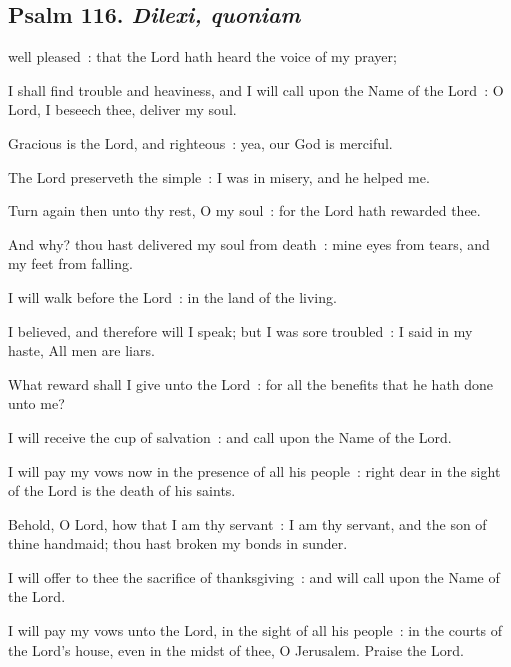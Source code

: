 \subsection{Psalm 116. \textit{Dilexi, quoniam}}


 well pleased~: that the Lord hath heard the voice of my prayer;\par
{}
I shall find trouble and heaviness, and I will call upon the Name of the Lord~: O Lord, I beseech thee, deliver my soul.\par
{}Gracious is the Lord, and righteous~: yea, our God is merciful.\par
{}The Lord preserveth the simple~: I was in misery, and he helped me.\par
{}Turn again then unto thy rest, O my soul~: for the Lord hath rewarded thee.\par
{}And why? thou hast delivered my soul from death~: mine eyes from tears, and my feet from falling.\par
{}I will walk before the Lord~: in the land of the living.\par
{}I believed, and therefore will I speak; but I was sore troubled~: I said in my haste, All men are liars.\par
{}What reward shall I give unto the Lord~: for all the benefits that he hath done unto me?\par
{}I will receive the cup of salvation~: and call upon the Name of the Lord.\par
{}I will pay my vows now in the presence of all his people~: right dear in the sight of the Lord is the death of his saints.\par
{}Behold, O Lord, how that I am thy servant~: I am thy servant, and the son of thine handmaid; thou hast broken my bonds in sunder.\par
{}I will offer to thee the sacrifice of thanksgiving~: and will call upon the Name of the Lord.\par
{}I will pay my vows unto the Lord, in the sight of all his people~: in the courts of the Lord's house, even in the midst of thee, O Jerusalem. Praise the Lord.\par



